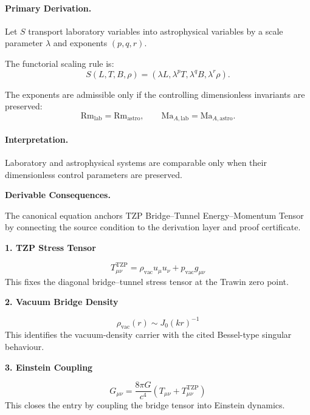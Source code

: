 \paragraph{Primary Derivation.}
Let $S$ transport laboratory variables into astrophysical variables by a scale parameter $\lambda$ and exponents $(p,q,r)$.

The functorial scaling rule is:
\begin{equation}
S(L,T,B,\rho)
=
(\lambda L,\lambda^{p}T,\lambda^{q}B,\lambda^{r}\rho).
\end{equation}

The exponents are admissible only if the controlling dimensionless invariants are preserved:
\begin{equation}
\boxed{
\mathrm{Rm}_{\mathrm{lab}}=\mathrm{Rm}_{\mathrm{astro}},
\qquad
\mathrm{Ma}_{A,\mathrm{lab}}=\mathrm{Ma}_{A,\mathrm{astro}}.
}
\end{equation}

\paragraph{Interpretation.}
Laboratory and astrophysical systems are comparable only when their dimensionless control parameters are preserved.

\par\vspace{0.35em}
\noindent\textbf{Derivable Consequences.}\quad
\begingroup
\footnotesize
\raggedright
The canonical equation anchors TZP Bridge--Tunnel Energy--Momentum Tensor by connecting the source condition to the derivation layer and proof certificate.
\par\endgroup

\noindent\textbf{1. TZP Stress Tensor}\par
\[
T^{\mathrm{TZP}}_{\mu\nu}=\rho_{\mathrm{vac}}u_{\mu}u_{\nu}+p_{\mathrm{vac}}g_{\mu\nu}
\]
\noindent This fixes the diagonal bridge--tunnel stress tensor at the Trawin zero point.\par
\noindent\textbf{2. Vacuum Bridge Density}\par
\[
\rho_{\mathrm{vac}}(r)\sim J_{0}(kr)^{-1}
\]
\noindent This identifies the vacuum-density carrier with the cited Bessel-type singular behaviour.\par
\noindent\textbf{3. Einstein Coupling}\par
\[
G_{\mu\nu}=\frac{8\pi G}{c^{4}}\left(T_{\mu\nu}+T^{\mathrm{TZP}}_{\mu\nu}\right)
\]
\noindent This closes the entry by coupling the bridge tensor into Einstein dynamics.\par

